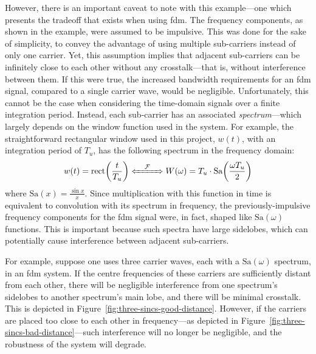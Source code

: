 \documentclass[class=report,11pt,crop=false]{standalone}
\begin{document}
However, there is an important caveat to note with this example---one which presents the tradeoff that exists when using \gls{fdm}. The frequency components, as shown in the example, were assumed to be impulsive. This was done for the sake of simplicity, to convey the advantage of using multiple sub-carriers instead of only one carrier. Yet, this assumption implies that adjacent sub-carriers can be infinitely close to each other without any crosstalk---that is, without interference between them. If this were true, the increased bandwidth requirements for an \gls{fdm} signal, compared to a single carrier wave, would be negligible. Unfortunately, this cannot be the case when considering the time-domain signals over a finite integration period. Instead, each sub-carrier has an associated \emph{spectrum}---which largely depends on the window function used in the system. For example, the straightforward rectangular window used in this project, \(w(t)\), with an integration period of \(T_u\), has the following spectrum in the frequency domain:
\begin{equation}
    w(t) = \textrm{rect}\bigg(\frac{t}{T_u}\bigg) \xLeftrightarrow{\quad\mathcal{F}\quad} W(\omega) = T_u \cdot \textrm{Sa}\bigg(\frac{\omega T_u}{2}\bigg)
\end{equation}
where \(\textrm{Sa}(x)=\frac{\sin{x}}{x}\). Since multiplication with this function in time is equivalent to convolution with its spectrum in frequency, the previously-impulsive frequency components for the \gls{fdm} signal were, in fact, shaped like \(\textrm{Sa}(\omega)\) functions. This is important because such spectra have large sidelobes, which can potentially cause interference between adjacent sub-carriers.

For example, suppose one uses three carrier waves, each with a \(\textrm{Sa}(\omega)\) spectrum, in an \gls{fdm} system. If the centre frequencies of these carriers are sufficiently distant from each other, there will be negligible interference from one spectrum's sidelobes to another spectrum's main lobe, and there will be minimal crosstalk. This is depicted in Figure~\ref{fig:three-sincs-good-distance}. However, if the carriers are placed too close to each other in frequency---as depicted in Figure~\ref{fig:three-sincs-bad-distance}---such interference will no longer be negligible, and the robustness of the system will degrade.
\end{document}
